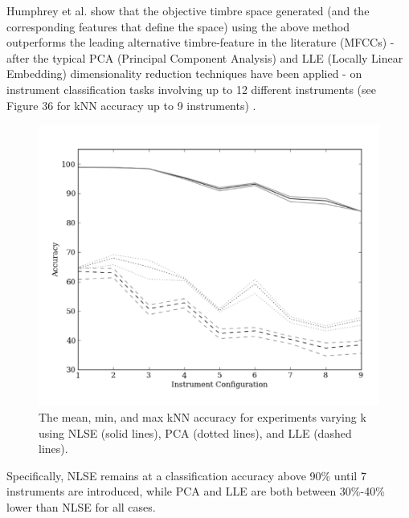 \documentclass[12pt]{report} 	%
\numberwithin{figure}{chapter}
\numberwithin{table}{chapter}
\numberwithin{equation}{chapter}
\begin{document}
\begin{flushleft}
Humphrey et al. show that the objective timbre space generated (and the corresponding features that define the space) using the above method outperforms the leading alternative timbre-feature in the literature (MFCCs) - after the typical PCA (Principal Component Analysis) and LLE (Locally Linear Embedding) dimensionality reduction techniques have been applied - on instrument classification tasks involving up to 12 different instruments (see Figure 36 for kNN accuracy up to 9 instruments) \cite{Humphrey:2000th}.
\begin{figure}[h!]
\begin{center}
\includegraphics[scale=0.85]{CNN_kNN}
\caption[kNN accuracy for NLSE, PCA, and LLE]{The mean, min, and max kNN accuracy for experiments varying k using NLSE (solid lines), PCA (dotted lines), and LLE (dashed lines).}
\end{center}
\vspace{6pt}
\end{figure}
Specifically, NLSE remains at a classification accuracy above 90\% until 7 instruments are introduced, while PCA and LLE are both between 30\%-40\% lower than NLSE for all cases.


\end{flushleft}
\end{document}
